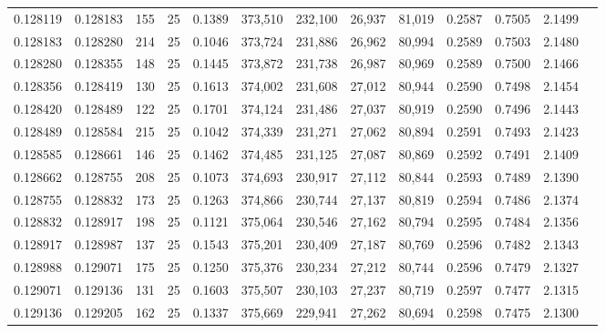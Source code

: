 \begin{tabular}{rrrrrrrrrrrrr}
0.128119 & 0.128183 &   155 &  25 &                                     0.1389 & 373,510 & 232,100 &  26,937 &  81,019 & 0.2587 & 0.7505 & 2.1499 \\
0.128183 & 0.128280 &   214 &  25 &                                     0.1046 & 373,724 & 231,886 &  26,962 &  80,994 & 0.2589 & 0.7503 & 2.1480 \\
0.128280 & 0.128355 &   148 &  25 &                                     0.1445 & 373,872 & 231,738 &  26,987 &  80,969 & 0.2589 & 0.7500 & 2.1466 \\
0.128356 & 0.128419 &   130 &  25 &                                     0.1613 & 374,002 & 231,608 &  27,012 &  80,944 & 0.2590 & 0.7498 & 2.1454 \\
0.128420 & 0.128489 &   122 &  25 &                                     0.1701 & 374,124 & 231,486 &  27,037 &  80,919 & 0.2590 & 0.7496 & 2.1443 \\
0.128489 & 0.128584 &   215 &  25 &                                     0.1042 & 374,339 & 231,271 &  27,062 &  80,894 & 0.2591 & 0.7493 & 2.1423 \\
0.128585 & 0.128661 &   146 &  25 &                                     0.1462 & 374,485 & 231,125 &  27,087 &  80,869 & 0.2592 & 0.7491 & 2.1409 \\
0.128662 & 0.128755 &   208 &  25 &                                     0.1073 & 374,693 & 230,917 &  27,112 &  80,844 & 0.2593 & 0.7489 & 2.1390 \\
0.128755 & 0.128832 &   173 &  25 &                                     0.1263 & 374,866 & 230,744 &  27,137 &  80,819 & 0.2594 & 0.7486 & 2.1374 \\
0.128832 & 0.128917 &   198 &  25 &                                     0.1121 & 375,064 & 230,546 &  27,162 &  80,794 & 0.2595 & 0.7484 & 2.1356 \\
0.128917 & 0.128987 &   137 &  25 &                                     0.1543 & 375,201 & 230,409 &  27,187 &  80,769 & 0.2596 & 0.7482 & 2.1343 \\
0.128988 & 0.129071 &   175 &  25 &                                     0.1250 & 375,376 & 230,234 &  27,212 &  80,744 & 0.2596 & 0.7479 & 2.1327 \\
0.129071 & 0.129136 &   131 &  25 &                                     0.1603 & 375,507 & 230,103 &  27,237 &  80,719 & 0.2597 & 0.7477 & 2.1315 \\
0.129136 & 0.129205 &   162 &  25 &                                     0.1337 & 375,669 & 229,941 &  27,262 &  80,694 & 0.2598 & 0.7475 & 2.1300 \\

\end{tabular}
